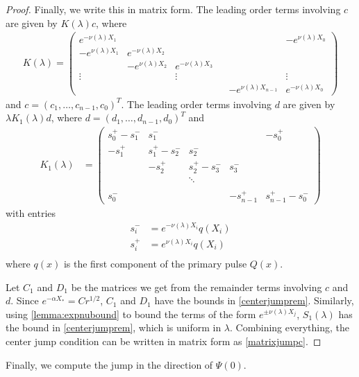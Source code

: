\documentclass[thesis.tex]{subfiles}
\begin{document}
\begin{lemma}
\begin{proof}
Finally, we write this in matrix form. The leading order terms involving $c$ are given by $K(\lambda)c$, where
\begin{align*}
K(\lambda) =  
\begin{pmatrix}
e^{-\nu(\lambda)X_1} & & & & & -e^{\nu(\lambda)X_0} \\
-e^{\nu(\lambda)X_1} & e^{-\nu(\lambda)X_2} \\
& -e^{\nu(\lambda)X_2} & e^{-\nu(\lambda)X_3} \\
\vdots & & \vdots & &&  \vdots \\
& & & & -e^{\nu(\lambda)X_{n-1}} & e^{-\nu(\lambda)X_0}
\end{pmatrix}
\end{align*}
and $c = (c_1, \dots, c_{n-1}, c_0)^T$. The leading order terms involving $d$ are given by $\lambda K_1(\lambda) d$, where $d = (d_1, \dots, d_{n-1}, d_0)^T$ and 
\begin{align*}
K_1(\lambda) &= \begin{pmatrix}
s_0^+ - s_1^- & s_1^- &&& -s_0^+ \\
-s_1^+ & s_1^+ - s_2^- & s_2^- \\
& -s_2^+ & s_2^+ - s_3^- & s_3^- \\ && \ddots \\
\\
s_0^- &&& -s_{n-1}^+ & s_{n-1}^+ - s_0^- 
\end{pmatrix}
\end{align*}
with entries
\begin{align*}
s_i^- &= e^{-\nu(\lambda)X_i} q(X_i)\\
s_i^+ &= e^{\nu(\lambda)X_i} q(X_i)\\
\end{align*}
where $q(x)$ is the first component of the primary pulse $Q(x)$.

Let $C_1$ and $D_1$ be the matrices we get from the remainder terms involving $c$ and $d$. Since $e^{-\alpha X_*} = C r^{1/2}$, $C_1$ and $D_1$ have the bounds in \cref{centerjumprem}. Similarly, using \cref{lemma:expnubound} to bound the terms of the form $e^{\pm \nu(\lambda)X_j}$, $S_1(\lambda)$ has the bound in \cref{centerjumprem}, which is uniform in $\lambda$. Combining everything, the center jump condition can be written in matrix form as \cref{matrixjumpc}.
\end{proof}
\end{lemma}

Finally, we compute the jump in the direction of $\Psi(0)$.
\end{document}
